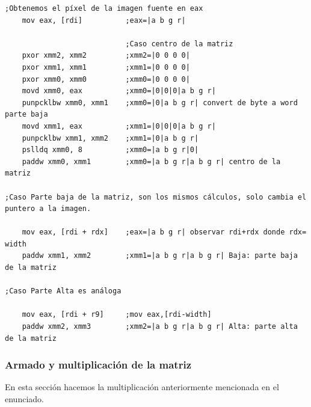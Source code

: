 \begin{codesnippet}
\begin{verbatim}    
;Obtenemos el píxel de la imagen fuente en eax
    mov eax, [rdi]          ;eax=|a b g r|

                            ;Caso centro de la matriz
    pxor xmm2, xmm2         ;xmm2=|0 0 0 0|
    pxor xmm1, xmm1         ;xmm1=|0 0 0 0|
    pxor xmm0, xmm0         ;xmm0=|0 0 0 0|
    movd xmm0, eax          ;xmm0=|0|0|0|a b g r|
    punpcklbw xmm0, xmm1    ;xmm0=|0|a b g r| convert de byte a word parte baja
    movd xmm1, eax          ;xmm1=|0|0|0|a b g r|
    punpcklbw xmm1, xmm2    ;xmm1=|0|a b g r|     
    pslldq xmm0, 8          ;xmm0=|a b g r|0|
    paddw xmm0, xmm1        ;xmm0=|a b g r|a b g r| centro de la matriz

;Caso Parte baja de la matriz, son los mismos cálculos, solo cambia el puntero a la imagen.

    mov eax, [rdi + rdx]    ;eax=|a b g r| observar rdi+rdx donde rdx= width
    paddw xmm1, xmm2        ;xmm1=|a b g r|a b g r| Baja: parte baja de la matriz

;Caso Parte Alta es análoga

    mov eax, [rdi + r9]     ;mov eax,[rdi-width]
    paddw xmm2, xmm3        ;xmm2=|a b g r|a b g r| Alta: parte alta de la matriz	
\end{verbatim}
\end{codesnippet}

\subsubsection*{Armado y multiplicación de la matriz}

En esta sección hacemos la multiplicación anteriormente mencionada en el enunciado.

